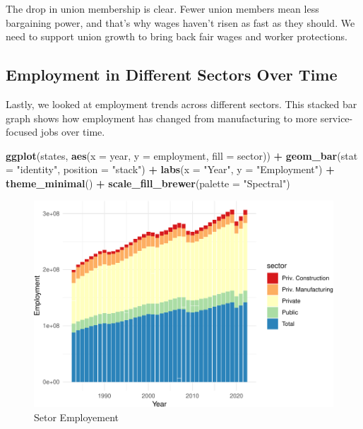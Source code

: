 \documentclass[
]{book}
\newenvironment{Shaded}{\begin{snugshade}}{\end{snugshade}}
\newcommand{\AttributeTok}[1]{\textcolor[rgb]{0.13,0.29,0.53}{#1}}
\newcommand{\FunctionTok}[1]{\textcolor[rgb]{0.13,0.29,0.53}{\textbf{#1}}}
\newcommand{\NormalTok}[1]{#1}
\newcommand{\SpecialCharTok}[1]{\textcolor[rgb]{0.81,0.36,0.00}{\textbf{#1}}}
\newcommand{\StringTok}[1]{\textcolor[rgb]{0.31,0.60,0.02}{#1}}
\theoremstyle{definition}
\theoremstyle{definition}
\theoremstyle{definition}
\theoremstyle{definition}
\theoremstyle{remark}
\begin{document}
The drop in union membership is clear. Fewer union members mean less bargaining power, and that's why wages haven't risen as fast as they should. We need to support union growth to bring back fair wages and worker protections.

\subsection{Employment in Different Sectors Over Time}\label{employment-in-different-sectors-over-time}

Lastly, we looked at employment trends across different sectors. This stacked bar graph shows how employment has changed from manufacturing to more service-focused jobs over time.

\begin{Shaded}
\begin{Highlighting}[]
\FunctionTok{ggplot}\NormalTok{(states, }\FunctionTok{aes}\NormalTok{(}\AttributeTok{x =}\NormalTok{ year, }\AttributeTok{y =}\NormalTok{ employment, }\AttributeTok{fill =}\NormalTok{ sector)) }\SpecialCharTok{+}
  \FunctionTok{geom\_bar}\NormalTok{(}\AttributeTok{stat =} \StringTok{"identity"}\NormalTok{, }\AttributeTok{position =} \StringTok{"stack"}\NormalTok{) }\SpecialCharTok{+}
  \FunctionTok{labs}\NormalTok{(}\AttributeTok{x =} \StringTok{"Year"}\NormalTok{, }\AttributeTok{y =} \StringTok{"Employment"}\NormalTok{) }\SpecialCharTok{+}
  \FunctionTok{theme\_minimal}\NormalTok{() }\SpecialCharTok{+}
  \FunctionTok{scale\_fill\_brewer}\NormalTok{(}\AttributeTok{palette =} \StringTok{"Spectral"}\NormalTok{)}
\end{Highlighting}
\end{Shaded}

\begin{figure}
\centering
\includegraphics{_main_files/figure-latex/sectoremploy-1.pdf}
\caption{\label{fig:sectoremploy}Setor Employement}
\end{figure}
\end{document}
